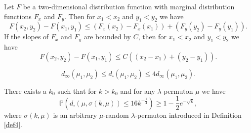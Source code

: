 \documentclass[10pt,a4paper]{amsart}
\def\P{{\mathbb {P}}}                       \def\Q{{\mathbb {Q}}}
\begin{document}
\begin{rem}
Let $F$ be a two-dimensional distribution function with marginal distribution functions
$F_x$  and $F_y$.
Then for $x_1<x_2$ and $y_1<y_2$ we have
\begin{equation} \label{H7}
F(x_2, y_2) -  F(x_1, y_1) \le (F_x(x_2) -  F_x(x_1)) + (F_y(y_2) -  F_y(y_1)).
\end{equation}
If the slopes of $F_x$  and $F_y$ are bounded by $C$, then
for $x_1<x_2$ and $y_1<y_2$ we have
\begin{equation} \label{H7+}
F(x_2, y_2) -  F(x_1, y_1) \le C((x_2 -  x_1) + (y_2 -  y_1)).
\end{equation}
\end{rem}

\begin{equation} \label{H34}
d_\infty(\mu_1,\mu_2) \le d_\square (\mu_1,\mu_2) \le 4 d_\infty(\mu_1,\mu_2) .
\end{equation}

\begin{lem}  \label{H4.2}
There exists a $k_0$ such that for $k> k_0$ and for any $\lambda$-permuton $\mu$ we have
\begin{equation} \label{H37}
\P \left( d_\square \left(\mu, \sigma(k, \mu)\right) \le 16 k^{-\frac{1}{4}}   \right)
\ge 1- \frac{1}{2} e^{-\sqrt{k}},
\end{equation}
where $\sigma(k, \mu)$ is an arbitrary $\mu$-random $\lambda$-permuton introduced in Definition \ref{def4}.
\end{lem}
\end{document}
